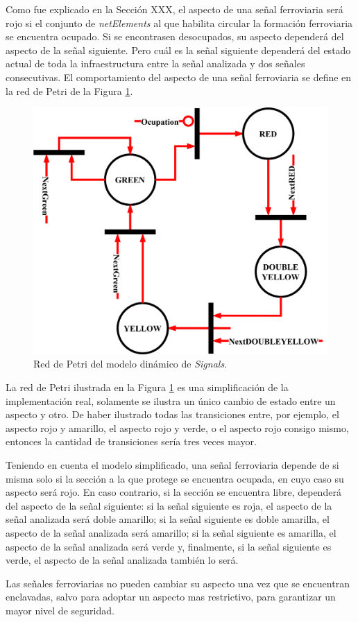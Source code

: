 Como fue explicado en la Sección XXX, el aspecto de una señal ferroviaria será rojo si el conjunto de \textit{netElements} al que habilita circular la formación ferroviaria se encuentra ocupado. Si se encontrasen desocupados, su aspecto dependerá del aspecto de la señal siguiente. Pero cuál es la señal siguiente dependerá del estado actual de toda la infraestructura entre la señal analizada y dos señales consecutivas. El comportamiento del aspecto de una señal ferroviaria se define en la red de Petri de la Figura \ref{fig:SIG_Petri}.

\begin{figure}[H]
	\centering
	\includegraphics[width=1\textwidth]{Figuras/SIG_petri}
	\centering\caption{Red de Petri del modelo dinámico de \textit{Signals}.}
	\label{fig:SIG_Petri}
\end{figure}

La red de Petri ilustrada en la Figura \ref{fig:SIG_Petri} es una simplificación de la implementación real, solamente se ilustra un único cambio de estado entre un aspecto y otro. De haber ilustrado todas las transiciones entre, por ejemplo, el aspecto rojo y amarillo, el aspecto rojo y verde, o el aspecto rojo consigo mismo, entonces la cantidad de transiciones sería tres veces mayor.

Teniendo en cuenta el modelo simplificado, una señal ferroviaria depende de si misma solo si la sección a la que protege se encuentra ocupada, en cuyo caso su aspecto será rojo. En caso contrario, si la sección se encuentra libre, dependerá del aspecto de la señal siguiente: si la señal siguiente es roja, el aspecto de la señal analizada será doble amarillo; si la señal siguiente es doble amarilla, el aspecto de la señal analizada será amarillo; si la señal siguiente es amarilla, el aspecto de la señal analizada será verde y, finalmente, si la señal siguiente es verde, el aspecto de la señal analizada también lo será.

Las señales ferroviarias no pueden cambiar su aspecto una vez que se encuentran enclavadas, salvo para adoptar un aspecto mas restrictivo, para garantizar un mayor nivel de seguridad.